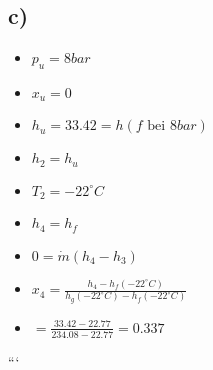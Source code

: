 

\subsection*{c)}

\begin{itemize}
    \item $p_u = 8bar$
    \item $x_u = 0$
    \item $h_u = 33.42 = h(f\text{ bei } 8bar)$
    \item $h_2 = h_u$
    \item $T_2 = -22^\circ C$
    \item $h_4 = h_f$
    \item $0 = \dot{m}(h_4 - h_3)$
    \item $x_4 = \frac{h_4 - h_f(-22^\circ C)}{h_g(-22^\circ C) - h_f(-22^\circ C)}$
    \item $= \frac{33.42 - 22.77}{234.08 - 22.77} = 0.337$
\end{itemize}

```